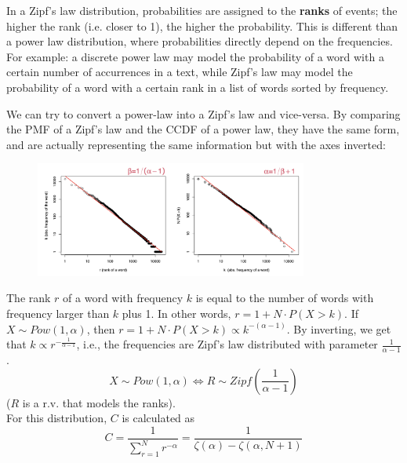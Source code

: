 In a Zipf's law distribution, probabilities are assigned to the \textbf{ranks} of events; the higher the rank (i.e. closer to 1), the higher the probability. This is different than a power law distribution, where probabilities directly depend on the frequencies. For example: a discrete power law may model the probability of a word with a certain number of accurrences in a text, while Zipf's law may model the probability of a word with a certain rank in a list of words sorted by frequency.

We can try to convert a power-law into a Zipf's law and vice-versa. By comparing the PMF of a Zipf's law and the CCDF of a power law, they have the same form, and are actually representing the same information but with the axes inverted:

\begin{figure}[ht]
    \centering
    \includegraphics*[width=0.8\textwidth]{img/zipf_vs_ccdf.png}
\end{figure}
The rank $r$ of a word with frequency $k$ is equal to the number of words with frequency larger than $k$ plus 1. In other words, $r = 1 + N \cdot P(X > k)$. If $X \sim Pow(1, \alpha)$, then $r = 1 + N \cdot P(X > k) \propto k^{-{(\alpha - 1)}}$. By inverting, we get that $k \propto r^{-\frac{1}{\alpha - 1}}$, i.e., the frequencies are Zipf's law distributed with parameter $\frac{1}{\alpha - 1}$.
\begin{equation*}
    X \sim Pow(1, \alpha) \iff R \sim Zipf \left (\frac{1}{\alpha - 1} \right )
\end{equation*}   
($R$ is a r.v. that models the ranks).\\
For this distribution, $C$ is calculated as
\begin{equation*}
    C = \frac{1}{\sum_{r=1}^{N} r^{-\alpha}} = \frac{1}{\zeta(\alpha) - \zeta(\alpha, N+1)}
\end{equation*}   